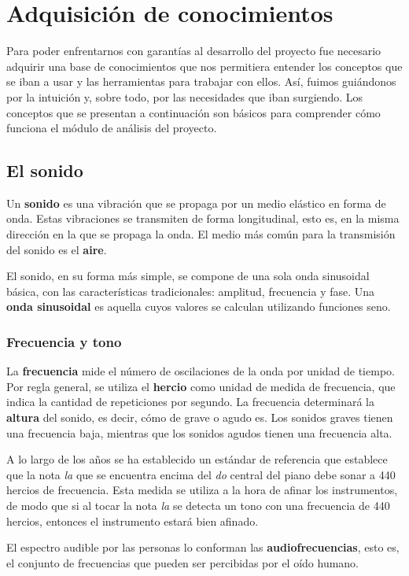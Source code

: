 \section{Adquisición de conocimientos}
Para poder enfrentarnos con garantías al desarrollo del proyecto fue necesario
adquirir una base de conocimientos que nos permitiera entender los conceptos
que se iban a usar y las herramientas para trabajar con ellos. Así, fuimos
guiándonos por la intuición y, sobre todo, por las necesidades que iban
surgiendo. Los conceptos que se presentan a continuación son básicos para
comprender cómo funciona el módulo de análisis del proyecto.

\subsection{El sonido}
Un \textbf{sonido} es una vibración que se propaga por un medio
elástico en forma de onda. Estas vibraciones se transmiten de forma
longitudinal, esto es, en la misma dirección en la que se propaga la
onda. El medio más común para la transmisión del sonido es el
\textbf{aire}. 

El sonido, en su forma más simple, se compone de una sola onda
sinusoidal básica, con las características tradicionales: amplitud,
frecuencia y fase. Una \textbf{onda sinusoidal} es aquella cuyos
valores se calculan utilizando funciones seno.

\subsubsection{Frecuencia y tono}
La \textbf{frecuencia} mide el número de oscilaciones de la onda por
unidad de tiempo. Por regla general, se utiliza el \textbf{hercio}
como unidad de medida de frecuencia, que indica la cantidad de
repeticiones por segundo. La frecuencia determinará la \textbf{altura}
del sonido, es decir, cómo de grave o agudo es. Los sonidos graves
tienen una frecuencia baja, mientras que los sonidos agudos tienen una
frecuencia alta.

A lo largo de los años se ha establecido un estándar de referencia que
establece que la nota \textit{la} que se encuentra encima del
\textit{do} central del piano debe sonar a 440 hercios de
frecuencia. Esta medida se utiliza a la hora de afinar los
instrumentos, de modo que si al tocar la nota \textit{la} se detecta
un tono con una frecuencia de 440 hercios, entonces el instrumento
estará bien afinado.

El espectro audible por las personas lo conforman las
\textbf{audiofrecuencias}, esto es, el conjunto de frecuencias que
pueden ser percibidas por el oído humano. 

